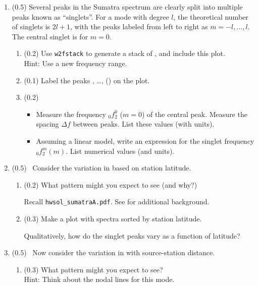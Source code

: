 \documentclass[11pt,titlepage,fleqn]{article}
\begin{document}
\begin{enumerate}
\item (0.5) Several peaks in the Sumatra spectrum are clearly split into multiple peaks known as ``singlets''. For a mode with degree $l$, the theoretical number of singlets is $2l+1$, with the peaks labeled from left to right as $m = -l,\ldots,l$. The central singlet is for $m=0$.
%
\begin{enumerate}
\item (0.2) Use \verb+w2fstack+ to generate a stack of , and include this plot. \\
Hint: Use a new frequency range.
\item (0.1) Label the peaks , \ldots,  () on the plot.
\item (0.2) 
\begin{itemize}
\item Measure the frequency $_0f_2^0$ ($m=0$) of the central peak. Measure the spacing $\Delta f$ between peaks. List these values (with units).
\item Assuming a linear model, write an expression for the singlet frequency $_0f_2^m(m)$. List numerical values (and units).
\end{itemize}
\end{enumerate}


\item (0.5) \ptag\ Consider the variation in  based on station latitude.
%
\begin{enumerate}
\item (0.2) What pattern might you expect to see (and why?)

Recall \verb+hwsol_sumatraA.pdf+.
See \citet[][Figure 3]{SSteinOkal2007} for additional background.

\item (0.3) Make a plot with   spectra sorted by station latitude.

Qualitatively, how do the singlet peaks vary as a function of latitude?

\end{enumerate}


\item (0.5) \ptag\ Now consider the variation in  with source-station distance.
%
\begin{enumerate}
\item (0.3) What pattern might you expect to see? \\
Hint: Think about the nodal lines for this mode.


\end{enumerate}
\end{enumerate}
\end{document}
